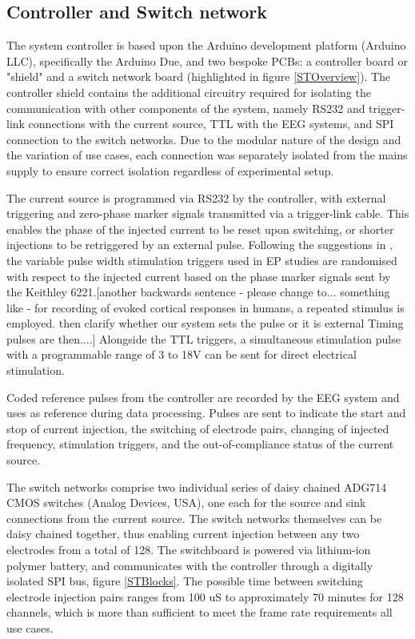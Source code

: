 \subsection{Controller and Switch network}

The system controller is based upon the Arduino development platform (Arduino LLC), specifically the Arduino Due, and two bespoke PCBs: a controller board or "shield" and a switch network board (highlighted in figure \ref{STOverview}). The controller shield contains the additional circuitry required for isolating the communication with other components of the system, namely RS232 and trigger-link connections with the current source, TTL with the EEG systems, and SPI connection to the switch networks. Due to the modular nature of the design and the variation of use cases, each connection was separately isolated from the mains supply to ensure correct isolation regardless of experimental setup.

The current source is programmed via RS232 by the controller, with external triggering and zero-phase marker signals transmitted via a trigger-link cable. This enables the phase of the injected current to be reset upon switching, or shorter injections to be retriggered by an external pulse. Following the suggestions in \cite{Aristovich_2015}, the variable pulse width stimulation triggers used in EP studies are randomised with respect to the injected current based on the phase marker signals sent by the Keithley 6221.[another backwards sentence - please change to... something like - for recording of evoked cortical responses in humans, a repeated stimulus is employed. {then clarify whether our system sets the pulse or it is external} Timing pulses are then....] Alongside the TTL triggers, a simultaneous stimulation pulse with a programmable range of 3 to 18V can be sent for direct electrical stimulation.

Coded reference pulses from the controller are recorded by the EEG system and uses as reference during data processing. Pulses are sent to indicate the start and stop of current injection, the switching of electrode pairs, changing of injected frequency, stimulation triggers, and the out-of-compliance status of the current source. 

The switch networks comprise two individual series of daisy chained ADG714 CMOS switches (Analog Devices, USA), one each for the source and sink connections from the current source. The switch networks themselves can be daisy chained together, thus enabling current injection between any two electrodes from a total of 128. The switchboard is powered via lithium-ion polymer battery, and communicates with the controller through a digitally isolated SPI bus, figure \ref{STBlocks}. The possible time between switching electrode injection pairs ranges from 100 uS to approximately 70 minutes for 128 channels, which is more than sufficient to meet the frame rate requirements all use cases. 